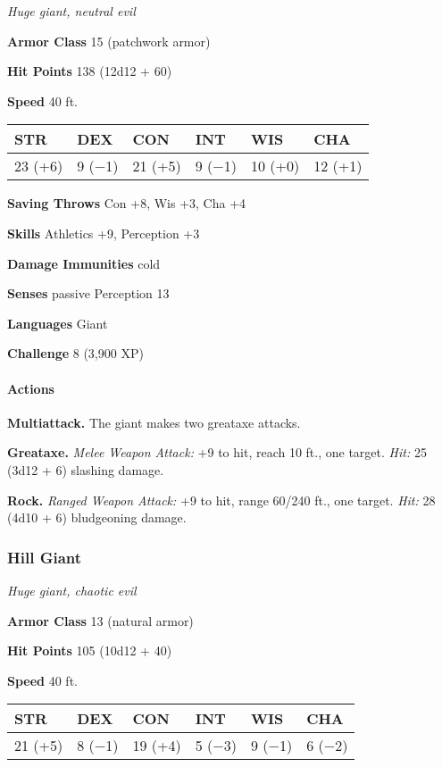 \documentclass[
]{article}
\begin{document}
\emph{Huge giant, neutral evil}

\textbf{Armor Class} 15 (patchwork armor)

\textbf{Hit Points} 138 (12d12 + 60)

\textbf{Speed} 40 ft.

\begin{longtable}[]{@{}llllll@{}}
\toprule
STR & DEX & CON & INT & WIS & CHA\tabularnewline
\midrule
\endhead
23 (+6) & 9 (−1) & 21 (+5) & 9 (−1) & 10 (+0) & 12 (+1)\tabularnewline
\bottomrule
\end{longtable}

\textbf{Saving Throws} Con +8, Wis +3, Cha +4

\textbf{Skills} Athletics +9, Perception +3

\textbf{Damage Immunities} cold

\textbf{Senses} passive Perception 13

\textbf{Languages} Giant

\textbf{Challenge} 8 (3,900 XP)

\hypertarget{actions-8}{%
\paragraph{Actions}\label{actions-8}}

\textbf{Multiattack.} The giant makes two greataxe attacks.

\textbf{Greataxe.} \emph{Melee Weapon Attack:} +9 to hit, reach 10 ft.,
one target. \emph{Hit:} 25 (3d12 + 6) slashing damage.

\textbf{Rock.} \emph{Ranged Weapon Attack:} +9 to hit, range 60/240 ft.,
one target. \emph{Hit:} 28 (4d10 + 6) bludgeoning damage.

\hypertarget{hill-giant}{%
\subsubsection{Hill Giant}\label{hill-giant}}

\emph{Huge giant, chaotic evil}

\textbf{Armor Class} 13 (natural armor)

\textbf{Hit Points} 105 (10d12 + 40)

\textbf{Speed} 40 ft.

\begin{longtable}[]{@{}llllll@{}}
\toprule
STR & DEX & CON & INT & WIS & CHA\tabularnewline
\midrule
\endhead
21 (+5) & 8 (−1) & 19 (+4) & 5 (−3) & 9 (−1) & 6 (−2)\tabularnewline
\bottomrule
\end{longtable}
\end{document}
